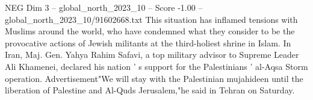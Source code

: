 \begin{textsample}{NEG Dim 3 – global\_north\_2023\_10 – Score -1.00 – global\_north\_2023\_10/91602668.txt}
This situation has inflamed tensions with Muslims around the world, who have condemned what they consider to be the provocative actions of Jewish militants at the third-holiest shrine in Islam.
In Iran, Maj.
Gen.
Yahya Rahim Safavi, a top military advisor to Supreme Leader Ali Khamenei, declared his nation ' s support for the Palestinians ' al-Aqsa Storm operation.
Advertisement"We will stay with the Palestinian mujahideen until the liberation of Palestine and Al-Quds Jerusalem,"he said in Tehran on Saturday.

\end{textsample}
